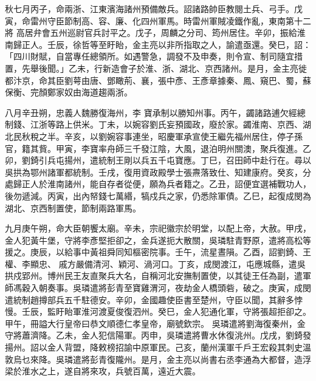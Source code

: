 \begin{pinyinscope}
 秋七月丙子，命兩浙、江東濱海諸州預備敵兵。詔諸路帥臣教閱土兵、弓手。戊寅，命雷州守臣節制高、容、廉、化四州軍馬。時雷州軍賊凌鐵作亂，東南第十二將
 高居弁會五州巡尉官兵討平之。戊子，周麟之分司、筠州居住。辛卯，振給淮南歸正人。壬辰，徐哲等至盱眙，金主亮以非所指取之人，諭遣亟還。癸巳，詔：「四川財賦，自當專任總領所。如遇警急，調發不及申奏，則令宣、制司隨宜措置，先舉後聞。」乙未，行新造會子於淮、浙、湖北、京西諸州。是月，金主亮徙都汴京，命其臣劉萼由唐、鄧瞰荊、襄，張中彥、王彥章據秦、鳳、窺巴、蜀，蘇保衡、完顏鄭家奴由海道趨兩浙。



 八月辛丑朔，忠義人魏勝復海州，李
 寶承制以勝知州事。丙午，蠲諸路逋欠經總制錢、江浙等路上供米。丁未，以婉容劉氏妄預國政，廢於家。蠲淮南、京西、湖北民秋稅之半。辛亥，以劉婉容事連坐，昭慶軍承宣使王繼先福州居住，停子孫官，籍其貲。甲寅，李寶率舟師三千發江陰，大風，退泊明州關澳，聚兵復進。乙卯，劉錡引兵屯揚州，遣統制王剛以兵五千屯寶應。丁巳，召田師中赴行在。尋以吳拱為鄂州諸軍都統制。壬戌，復用資政殿學士張燾落致仕、知建康府。癸亥，分
 處歸正人於淮南諸州，能自存者從便，願為兵者籍之。乙丑，詔便宜選補戰功人，後勿遞減。丙寅，出內帑錢七萬緡，犒戍兵之家，仍悉除軍債。乙巳，起復成閔為湖北、京西制置使，節制兩路軍馬。



 九月庚午朔，命大臣朝饗太廟。辛未，宗祀徽宗於明堂，以配上帝，大赦。甲戌，金人犯黃牛堡，守將李彥堅拒卻之，金兵遂扼大散關，吳璘駐青野原，遣將高松等援之。庚辰，以給事中黃祖舜同知樞密院事。壬午，流星晝隕。乙酉，詔劉錡、王權、李顯忠、
 戚方嚴備清河、穎河、渦河口。丁亥，成閔渡江，屯應城縣，遣吳拱戍郢州。博州民王友直聚兵大名，自稱河北安撫制置使，以其徒王任為副，遣軍師馮穀入朝奏事。吳璘遣將彭青至寶雞渭河，夜劫金人橋頭砦，破之。庚寅，成閔遣統制趙撙部兵五千駐德安。辛卯，金國趣使臣書至楚州，守臣以聞，其辭多悖慢。壬辰，監盱眙軍淮河渡夏俊復泗州。癸巳，金人犯通化軍，守將張超拒卻之。甲午，冊謚大行皇帝曰恭文順德仁孝皇帝，廟號欽宗。
 吳璘遣將劉海復秦州，金守將蕭濟降。乙未，金人犯信陽軍。丙申，吳璘遣將曹水休復洮州。戊戌，劉錡發揚州。詔以金人背盟，降敕榜招諭中原軍民。己亥，蘭州漢軍千戶王宏殺其刺史溫敦烏乜來降。吳璘遣將彭青復隴州。是月，金主亮以尚書右丞李通為大都督，造浮梁於淮水之上，遂自將來攻，兵號百萬，遠近大震。




\end{pinyinscope}
